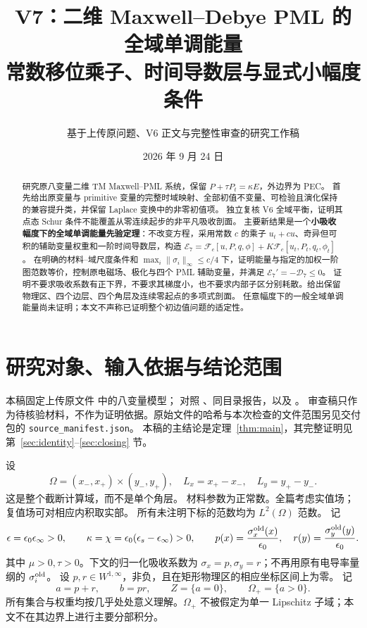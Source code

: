 \documentclass[UTF8,a4paper,11pt,fontset=none]{ctexart}
\title{V7：二维 Maxwell--Debye PML 的全域单调能量\\[5pt]
\large 常数移位乘子、时间导数层与显式小幅度条件}
\author{基于上传原问题、V6 正文与完整性审查的研究工作稿}
\date{2026 年 9 月 24 日}
\numberwithin{equation}{section}
\theoremstyle{definition}
\theoremstyle{definition}
\newcommand{\Om}{\Omega}
\newcommand{\eps}{\epsilon}
\newcommand{\Ecal}{\mathcal E}
\newcommand{\Dcal}{\mathcal D}
\newcommand{\Fc}{\mathcal F_c}
\begin{document}
\maketitle
\begin{abstract}
研究原八变量二维 TM Maxwell--PML 系统，保留 $P+\tau P_t=\kappa E$，外边界为 PEC。
首先给出原变量与 primitive 变量的完整时域映射、全部初值不变量、可检验且演化保持的兼容提升类，并保留 Laplace 变换中的非零初值项。
独立复核 V6 全域平衡，证明其点态 Schur 条件不能覆盖从零连续起步的非平凡吸收剖面。
主要新结果是一个\textbf{小吸收幅度下的全域单调能量先验定理}：不改变方程，采用常数 $c$ 的乘子 $u_t+cu$、奇异但可积的辅助变量权重和一阶时间导数层，构造
$\Ecal_7=\Fc[u,P,q,\phi]+K\Fc[u_t,P_t,q_t,\phi_t]$。
在明确的材料--域尺度条件和 $\max_i\|\sigma_i\|_\infty\le c/4$ 下，证明能量与指定的加权一阶图范数等价，控制原电磁场、极化与四个 PML 辅助变量，并满足 $\Ecal_7'=-\Dcal_7\le0$。
证明不要求吸收系数有正下界，不要求其梯度小，也不要求内部子区分别耗散。给出保留物理区、四个边层、四个角层及连续零起点的多项式剖面。
任意幅度下的一般全域单调能量尚未证明；本文不声称已证明整个初边值问题的适定性。
\end{abstract}
\tableofcontents
\newpage

\section{研究对象、输入依据与结论范围}

本稿固定上传原文件  中的八变量模型；
对照 、同目录报告，以及
。
审查稿只作为待核验材料，不作为证明依据。原始文件的哈希与本次检查的文件范围另见交付包的 \texttt{source\_manifest.json}。
本稿的主结论是定理~\ref{thm:main}，其完整证明见第~\ref{sec:identity}--\ref{sec:closing} 节。

设
\[
\Om=(x_-,x_+)\times(y_-,y_+),\quad L_x=x_+-x_-,\quad L_y=y_+-y_-.
\]
这是整个截断计算域，而不是单个角层。
材料参数为正常数。全篇考虑实值场；复值场可对相应内积取实部。
所有未注明下标的范数均为 $L^2(\Om)$ 范数。
记
\begin{equation}\label{eq:normalization}
 \eps=\eps_0\eps_\infty>0,\qquad
 \kappa=\chi=\eps_0(\eps_s-\eps_\infty)>0,\qquad
 p(x)=\frac{\sigma_x^{\rm old}(x)}{\eps_0},\quad
 r(y)=\frac{\sigma_y^{\rm old}(y)}{\eps_0}.
\end{equation}
其中 $\mu>0,\tau>0$。下文的归一化吸收系数为
$\sigma_x=p,\sigma_y=r$；不再用原有电导率量纲的 $\sigma_i^{\rm old}$。
设 $p,r\in W^{1,\infty}$，非负，且在矩形物理区的相应坐标区间上为零。
记
\[
 a=p+r,\qquad b=pr,\qquad Z=\{a=0\},\qquad \Om_+=\{a>0\}.
\]
所有集合与权重均按几乎处处意义理解。$\Om_+$ 不被假定为单一 Lipschitz 子域；本文不在其边界上进行主要分部积分。
\end{document}
